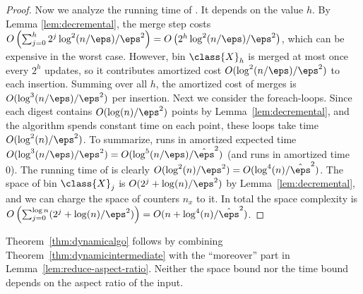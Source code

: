 \begin{proof}
%
    Now we analyze the running time of \ins. It depends on the value $h$. By Lemma \ref{lem:decremental}, the merge step costs $O \left( \sum_{j = 0}^h 2^j \log^2(n/\eps) / \eps^2 \right) = O \left( 2^h \log^2(n/\eps) / \eps^2 \right)$, which can be expensive in the worst case. However, bin $\class{X}_h$ is merged at most once every $2^h$ updates, so it contributes amortized cost $O(\log^2(n/\eps) / \eps^2)$ to each insertion. Summing over all $h$, the amortized cost of merges is $O(\log^3(n/\eps) / \eps^2)$ per insertion.
    Next we consider the foreach-loops. Since each digest contains $O(\log(n) / \eps^2)$ points by Lemma~\ref{lem:decremental}, and the algorithm spends constant time on each point, these loops take time $O(\log^2(n) / \eps^2)$.
    To summarize, \ins runs in amortized expected time $O(\log^3(n/\eps) / \eps^2) = O(\log^5(n/\eps) / \hat \eps^2)$ (and \del runs in amortized time 0).
%
    The running time of \est is clearly $O(\log^2(n) / \eps^2) = O(\log^4(n)/\hat \eps^2)$.
%
    The space of bin $\class{X}_j$ is $O(2^j + \log(n) / \eps^2)$ by Lemma~\ref{lem:decremental}, and we can charge the space of counters $n_x$ to it. In total the space complexity is $O\left( \sum_{j=0}^{\log n} (2^j + \log(n) / \eps^2) \right) = O(n + \log^4(n) / \hat \eps^2)$.
\end{proof}
%
Theorem~\ref{thm:dynamicalgo} follows by combining Theorem~\ref{thm:dynamicintermediate} with the ``moreover'' part in Lemma~\ref{lem:reduce-aspect-ratio}. Neither the space bound nor the time bound depends on the aspect ratio of the input.
%
